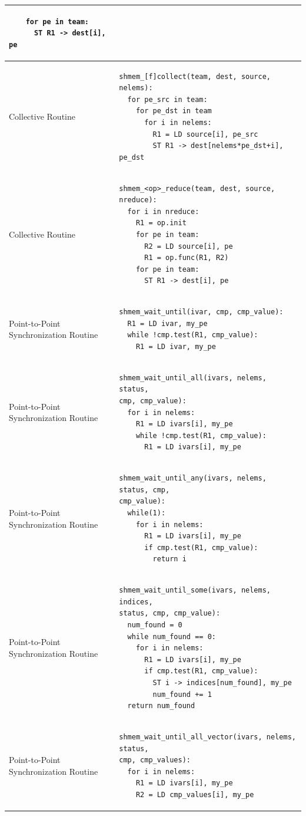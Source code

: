 \begin{longtable}{|m{}|m{}|}
\begin{BVerbatim}
    for pe in team:
      ST R1 -> dest[i], pe
    \end{BVerbatim}
    \tabularnewline\hline
Collective Routine
    & \begin{BVerbatim}
shmem_[f]collect(team, dest, source, nelems):
  for pe_src in team:
    for pe_dst in team
      for i in nelems:
        R1 = LD source[i], pe_src
        ST R1 -> dest[nelems*pe_dst+i], pe_dst
    \end{BVerbatim}
    \tabularnewline\hline
Collective Routine
    & \begin{BVerbatim}
shmem_<op>_reduce(team, dest, source, nreduce):
  for i in nreduce:
    R1 = op.init
    for pe in team:
      R2 = LD source[i], pe
      R1 = op.func(R1, R2)
    for pe in team:
      ST R1 -> dest[i], pe
    \end{BVerbatim}
    \tabularnewline\hline
Point-to-Point Synchronization Routine
    & \begin{BVerbatim}
shmem_wait_until(ivar, cmp, cmp_value):
  R1 = LD ivar, my_pe
  while !cmp.test(R1, cmp_value):
    R1 = LD ivar, my_pe
    \end{BVerbatim}
    \tabularnewline\hline
Point-to-Point Synchronization Routine
    & \begin{BVerbatim}
shmem_wait_until_all(ivars, nelems, status,
cmp, cmp_value):
  for i in nelems:
    R1 = LD ivars[i], my_pe
    while !cmp.test(R1, cmp_value):
      R1 = LD ivars[i], my_pe
    \end{BVerbatim}
    \tabularnewline\hline
Point-to-Point Synchronization Routine
    & \begin{BVerbatim}
shmem_wait_until_any(ivars, nelems, status, cmp,
cmp_value):
  while(1):
    for i in nelems:
      R1 = LD ivars[i], my_pe
      if cmp.test(R1, cmp_value):
        return i
    \end{BVerbatim}
    \tabularnewline\hline
Point-to-Point Synchronization Routine
    & \begin{BVerbatim}
shmem_wait_until_some(ivars, nelems, indices,
status, cmp, cmp_value):
  num_found = 0
  while num_found == 0:
    for i in nelems:
      R1 = LD ivars[i], my_pe
      if cmp.test(R1, cmp_value):
        ST i -> indices[num_found], my_pe
        num_found += 1
  return num_found
    \end{BVerbatim}
    \tabularnewline\hline
Point-to-Point Synchronization Routine
    & \begin{BVerbatim}
shmem_wait_until_all_vector(ivars, nelems, status,
cmp, cmp_values):
  for i in nelems:
    R1 = LD ivars[i], my_pe
    R2 = LD cmp_values[i], my_pe

\end{BVerbatim}
\end{longtable}
